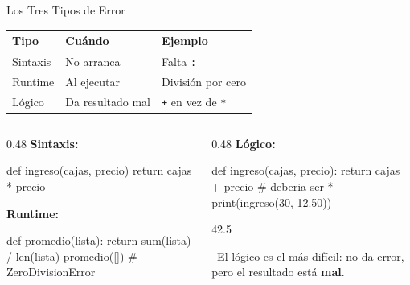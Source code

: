 \documentclass[aspectratio=169, 11pt]{beamer}
\begin{document}
\begin{frame}[fragile,shrink=28]{Los Tres Tipos de Error}
  \vspace{-6pt}
  {\footnotesize
  \begin{tabular}{@{}lll@{}}
    \toprule
    \textbf{Tipo} & \textbf{Cuándo} & \textbf{Ejemplo} \\
    \midrule
    Sintaxis & No arranca & Falta \texttt{:} \\
    Runtime  & Al ejecutar & División por cero \\
    Lógico   & Da resultado mal & \texttt{+} en vez de \texttt{*} \\
    \bottomrule
  \end{tabular}
  }

  \vspace{6pt}
  \begin{columns}[T]
    \begin{column}{0.48\textwidth}
      {\scriptsize\color{arcaRed}\bfseries Sintaxis:}
      \begin{pyblock}[minted options={fontsize=\scriptsize, breaklines}]
def ingreso(cajas, precio)
    return cajas * precio
      \end{pyblock}

      \vspace{2pt}
      {\scriptsize\color{codeOrange}\bfseries Runtime:}
      \begin{pyblock}[minted options={fontsize=\scriptsize, breaklines}]
def promedio(lista):
    return sum(lista) / len(lista)
promedio([])  # ZeroDivisionError
      \end{pyblock}
    \end{column}

    \begin{column}{0.48\textwidth}
      {\scriptsize\color{codeBlue}\bfseries Lógico:}
      \begin{pyblock}[minted options={fontsize=\scriptsize, breaklines}]
def ingreso(cajas, precio):
    return cajas + precio  # deberia ser *
print(ingreso(30, 12.50))
      \end{pyblock}
      \vspace{-2pt}
      \begin{outputblock}[minted options={fontsize=\scriptsize, breaklines}]
42.5
      \end{outputblock}

      \vspace{2pt}
      {\scriptsize\color{textMuted}
        \faExclamationTriangle\ El lógico es el más difícil:
        no da error, pero el resultado está \textbf{mal}.}
    \end{column}
  \end{columns}
\end{frame}
\end{document}
